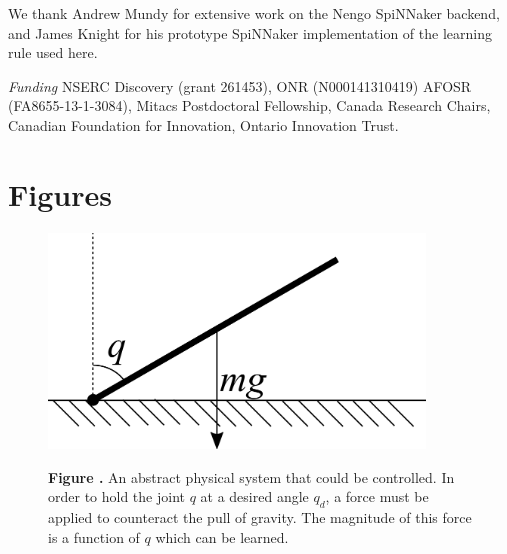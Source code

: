 \documentclass{frontiersSCNS} %
\begin{document}
We thank Andrew Mundy for extensive work on the Nengo SpiNNaker backend, and
James Knight for his prototype SpiNNaker implementation of the learning rule used here.

\textit{Funding\textcolon} 
NSERC Discovery (grant 261453),
ONR (N000141310419)
AFOSR (FA8655-13-1-3084),
Mitacs Postdoctoral Fellowship,
Canada Research Chairs,
Canadian Foundation for Innovation,
Ontario Innovation Trust.




\section*{Figures}


\begin{figure}[h!]
\begin{center}
\includegraphics[width=10cm]{figures/SingleArmSystem}
\end{center}
 \textbf{\label{fig:system} Figure .}{ 
     An abstract physical system that could be controlled.  In order to hold
     the joint $q$ at a desired angle $q_d$, a force must be applied to
     counteract the pull of gravity.  The magnitude of this force is a
 function of $q$ which can be learned.}
\end{figure}
\end{document}
